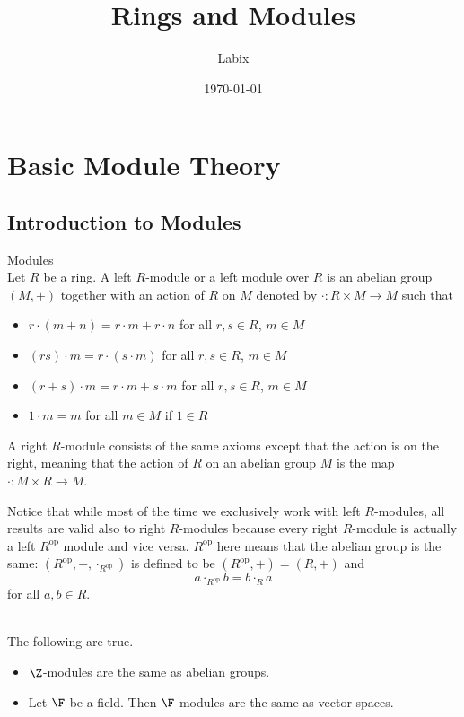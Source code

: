 \documentclass[a4paper]{article}
\title{Rings and Modules}
\author{Labix}
\date{\today}
\begin{document}
\maketitle

\pagebreak
\tableofcontents

\pagebreak
\section{Basic Module Theory}
\subsection{Introduction to Modules}
\begin{defn}{Modules}{}\\
Let $R$ be a ring. A left $R$-module or a left module over $R$ is an abelian group $(M,+)$ together with an action of $R$ on $M$ denoted by $\cdot:R\times M\to M$ such that 
\begin{itemize}
\item $r\cdot (m+n)=r\cdot m+r\cdot n$ for all $r,s\in R$, $m\in M$
\item $(rs)\cdot m=r\cdot (s\cdot m)$ for all $r,s\in R$, $m\in M$
\item $(r+s)\cdot m=r\cdot m+s\cdot m$ for all $r,s\in R$, $m\in M$
\item $1\cdot m=m$ for all $m\in M$ if $1\in R$
\end{itemize}
A right $R$-module consists of the same axioms except that the action is on the right, meaning that the action of $R$ on an abelian group $M$ is the map $\cdot:M\times R\to M$. 
\end{defn}

Notice that while most of the time we exclusively work with left $R$-modules, all results are valid also to right $R$-modules because every right $R$-module is actually a left $R^{\text{op}}$ module and vice versa. $R^{\text{op}}$ here means that the abelian group is the same: $(R^{\text{op}},+,\cdot_{R^\text{op}})$ is defined to be $(R^\text{op},+)=(R,+)$ and $$a\cdot_{R^{\text{op}}}b=b\cdot_R a$$ for all $a,b\in R$. 

\begin{eg}{}{}\\
The following are true. 
\begin{itemize}
\item $\Z$-modules are the same as abelian groups. 
\item Let $\F$ be a field. Then $\F$-modules are the same as vector spaces. 
\end{itemize}
\end{eg}
\end{document}
